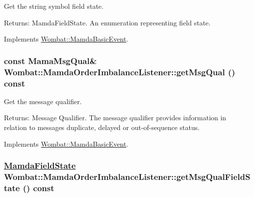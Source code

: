 Get the string symbol field state. 

\begin{Desc}
\item[Returns:]Mamda\-Field\-State. An enumeration representing field state. \end{Desc}


Implements \hyperlink{classWombat_1_1MamdaBasicEvent_ef95e19f4babb0e5ea8549d6cf29d13f}{Wombat::Mamda\-Basic\-Event}.\hypertarget{classWombat_1_1MamdaOrderImbalanceListener_5420e2c89b36475cf11a698bda2fdb05}{
\subsubsection[getMsgQual]{\setlength{\rightskip}{0pt plus 5cm}const Mama\-Msg\-Qual\& Wombat::Mamda\-Order\-Imbalance\-Listener::get\-Msg\-Qual () const}}
\label{classWombat_1_1MamdaOrderImbalanceListener_5420e2c89b36475cf11a698bda2fdb05}


Get the message qualifier. 

\begin{Desc}
\item[Returns:]Message Qualifier. The message qualifier provides information in relation to messages duplicate, delayed or out-of-sequence status. \end{Desc}


Implements \hyperlink{classWombat_1_1MamdaBasicEvent_675ce8f1de581548426335423d6b3864}{Wombat::Mamda\-Basic\-Event}.\hypertarget{classWombat_1_1MamdaOrderImbalanceListener_5847f899d32947c2d9a0356733f84e78}{
\subsubsection[getMsgQualFieldState]{\setlength{\rightskip}{0pt plus 5cm}\hyperlink{namespaceWombat_93aac974f2ab713554fd12a1fa3b7d2a}{Mamda\-Field\-State} Wombat::Mamda\-Order\-Imbalance\-Listener::get\-Msg\-Qual\-Field\-State () const}}
\label{classWombat_1_1MamdaOrderImbalanceListener_5847f899d32947c2d9a0356733f84e78}


